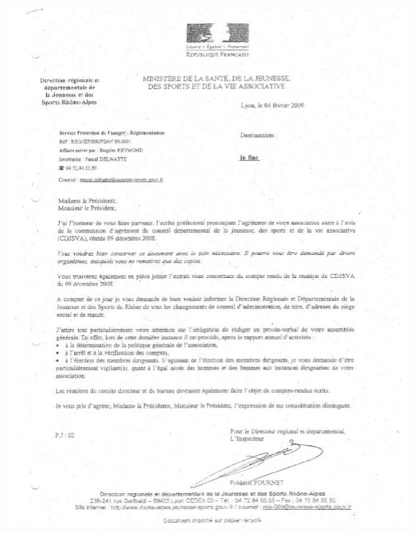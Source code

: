 \documentclass[hidelinks, paper=a4, fontsize=13pt]{report}
\begin{document}
\begin{center}
\includegraphics[scale=0.85]{Annexes/Documents/AgrementJeunesseEtSports}
\end{center}
\end{document}
